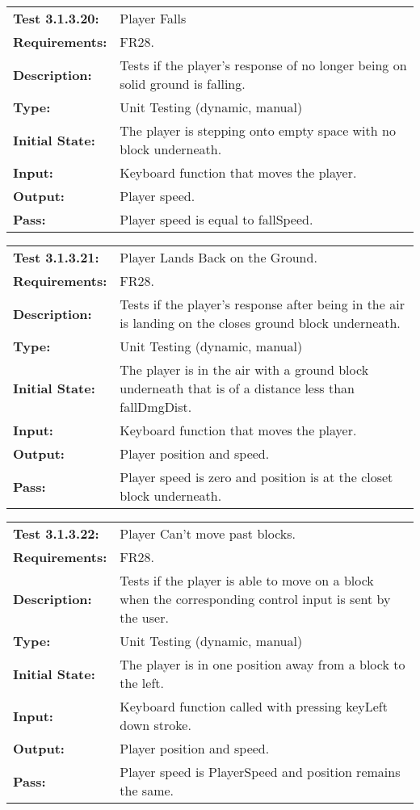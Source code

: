 \documentclass[12pt, titlepage]{article}
\begin{document}
\begin{tabular}{|l|p{10cm}|}
    \hline
    \bf{Test} 3.1.3.20: &  Player Falls\\
    \bf{Requirements}: & FR28.\\
    \bf{Description}: & Tests if the player's response of no longer being on solid ground is falling. \\
    \bf{Type}: & Unit Testing (dynamic, manual) \\
    \bf{Initial State}: & The player is stepping onto empty space with no block underneath. \\
    \bf{Input}: & Keyboard function that moves the player.\\
    \bf{Output}: & Player speed.\\
    \bf{Pass}: & Player speed is equal to fallSpeed.\\
    \hline
\end{tabular}

\begin{tabular}{|l|p{10cm}|}
    \hline
    \bf{Test} 3.1.3.21: &  Player Lands Back on the Ground.\\
    \bf{Requirements}: & FR28.\\
    \bf{Description}: & Tests if the player's response after being in the air is landing on the closes ground block underneath. \\
    \bf{Type}: & Unit Testing (dynamic, manual) \\
    \bf{Initial State}: & The player is in the air with a ground block underneath that is of a distance less than fallDmgDist. \\
    \bf{Input}: & Keyboard function that moves the player. \\
    \bf{Output}: & Player position and speed.\\
    \bf{Pass}: & Player speed is zero and position is at the closet block underneath.\\
    \hline
\end{tabular}

\begin{tabular}{|l|p{10cm}|}
    \hline
    \bf{Test} 3.1.3.22: &  Player Can't move past blocks.\\
    \bf{Requirements}: & FR28.\\
    \bf{Description}: & Tests if the player is able to move on a block when the corresponding control input is sent by the user. \\
    \bf{Type}: & Unit Testing (dynamic, manual) \\
    \bf{Initial State}: & The player is in one position away from a block to the left. \\
    \bf{Input}: & Keyboard function called with pressing keyLeft down stroke.\\
    \bf{Output}: & Player position and speed.\\
    \bf{Pass}: & Player speed is PlayerSpeed and position remains the same.\\
    \hline
\end{tabular}
\end{document}
